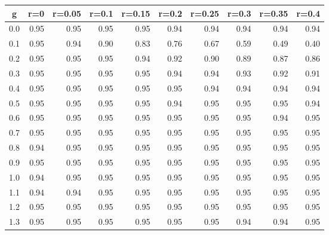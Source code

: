 %
\begin{table}[!tbp]
 \begin{center}
 \begin{tabular}{rrrrrrrrrr}\hline\hline
\multicolumn{1}{c}{g}&\multicolumn{1}{c}{r=0}&\multicolumn{1}{c}{r=0.05}&\multicolumn{1}{c}{r=0.1}&\multicolumn{1}{c}{r=0.15}&\multicolumn{1}{c}{r=0.2}&\multicolumn{1}{c}{r=0.25}&\multicolumn{1}{c}{r=0.3}&\multicolumn{1}{c}{r=0.35}&\multicolumn{1}{c}{r=0.4}\tabularnewline
\hline
0.0&0.95&0.95&0.95&0.95&0.94&0.94&0.94&0.94&0.94\tabularnewline
0.1&0.95&0.94&0.90&0.83&0.76&0.67&0.59&0.49&0.40\tabularnewline
0.2&0.95&0.95&0.95&0.94&0.92&0.90&0.89&0.87&0.86\tabularnewline
0.3&0.95&0.95&0.95&0.95&0.94&0.94&0.93&0.92&0.91\tabularnewline
0.4&0.95&0.95&0.95&0.95&0.95&0.94&0.94&0.94&0.94\tabularnewline
0.5&0.95&0.95&0.95&0.95&0.94&0.95&0.95&0.95&0.94\tabularnewline
0.6&0.95&0.95&0.95&0.95&0.95&0.95&0.95&0.94&0.95\tabularnewline
0.7&0.95&0.95&0.95&0.95&0.95&0.95&0.95&0.95&0.95\tabularnewline
0.8&0.94&0.95&0.95&0.95&0.95&0.95&0.95&0.95&0.95\tabularnewline
0.9&0.95&0.95&0.95&0.95&0.95&0.95&0.95&0.95&0.95\tabularnewline
1.0&0.94&0.95&0.95&0.95&0.95&0.95&0.95&0.95&0.95\tabularnewline
1.1&0.94&0.94&0.95&0.95&0.95&0.95&0.95&0.95&0.95\tabularnewline
1.2&0.95&0.95&0.95&0.95&0.95&0.95&0.95&0.95&0.95\tabularnewline
1.3&0.95&0.95&0.95&0.95&0.95&0.95&0.94&0.94&0.95\tabularnewline
\hline
\end{tabular}

\end{center}

\end{table}

